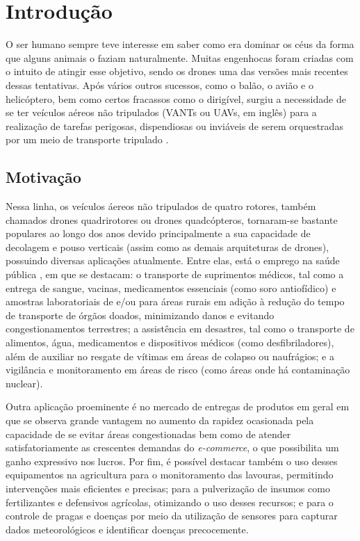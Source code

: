 \section{Introdução}
O ser humano sempre teve interesse em saber como era dominar os céus da forma que alguns animais o faziam 
naturalmente. Muitas engenhocas foram criadas com o intuito de atingir esse objetivo, sendo os drones uma das 
versões mais recentes dessas tentativas. Após vários outros sucessos, como o balão, o avião e o helicóptero, bem 
como certos fracassos como o dirigível, surgiu a necessidade de se ter veículos aéreos não tripulados (VANTs ou 
UAVs, em inglês) para a realização de tarefas perigosas, dispendiosas ou inviáveis de serem orquestradas por um 
meio de transporte tripulado \cite{ita}.

\subsection{Motivação}
Nessa linha, os veículos áereos não tripulados de quatro rotores, também chamados drones quadrirotores ou drones 
quadcópteros, tornaram-se bastante populares ao longo dos anos devido principalmente a sua capacidade de decolagem 
e pouso verticais (assim como as demais arquiteturas de drones), possuindo diversas aplicações atualmente. Entre 
elas, está o emprego na saúde pública \cite{drone_medico}, em que se destacam: o transporte de suprimentos médicos, 
tal como a entrega de sangue, vacinas, medicamentos essenciais (como soro antiofídico) e amostras laboratoriais de 
e/ou para áreas rurais em adição à redução do tempo de transporte de órgãos doados, minimizando danos e evitando 
congestionamentos terrestres; a assistência em desastres, tal como o transporte de alimentos, água, medicamentos e 
dispositivos médicos (como desfibriladores), além de auxiliar no resgate de vítimas em áreas de colapso ou 
naufrágios; e a vigilância e monitoramento em áreas de risco (como áreas onde há contaminação nuclear).

Outra aplicação proeminente é no mercado de entregas de produtos em geral \cite{drone_entrega} em que se observa 
grande vantagem no aumento da rapidez ocasionada pela capacidade de se evitar áreas congestionadas bem como de 
atender satisfatoriamente as crescentes demandas do \textit{e-commerce}, o que possibilita um ganho expressivo nos 
lucros. Por fim, é possível destacar também o uso desses equipamentos na agricultura \cite{drone_agricultura} para o 
monitoramento das lavouras, permitindo intervenções mais eficientes e precisas; para a pulverização de insumos como 
fertilizantes e defensivos agrícolas, otimizando o uso desses recursos; e para o controle de pragas e doenças por meio 
da utilização de sensores para capturar dados meteorológicos e identificar doenças precocemente.

